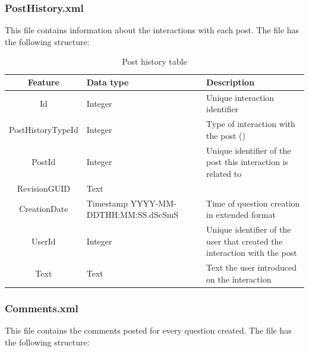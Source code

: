 \documentclass[11pt]{article} %
\begin{document}
    \subsubsection{PostHistory.xml}

      This file contains information about the interactions with each post. The file has the following structure:

      \begin{table}[!h]
        \centering
        \begin{tabular}{|c|p{}|p{}|}
          \hline

          Feature & Data type & Description \\ \hline
          Id & Integer & Unique interaction identifier \\ \hline
          PostHistoryTypeId & Integer & Type of interaction with the post () \\ \hline
          PostId & Integer & Unique identifier of the post this interaction is related to \\ \hline
          RevisionGUID & Text &  \\ \hline
          CreationDate & Timestamp YYYY-MM-DDTHH:MM:SS.dScSmS & Time of question creation in extended format \\ \hline
          UserId & Integer & Unique identifier of the user that created the interaction with the post \\ \hline
          Text & Text & Text the user introduced on the interaction \\ \hline

          \hline
        \end{tabular}
        \caption{Post history table}
        \label{tab:posthistory}
      \end{table}

    \subsubsection{Comments.xml}

      This file contains the comments posted for every question created. The file has the following structure:
\end{document}
